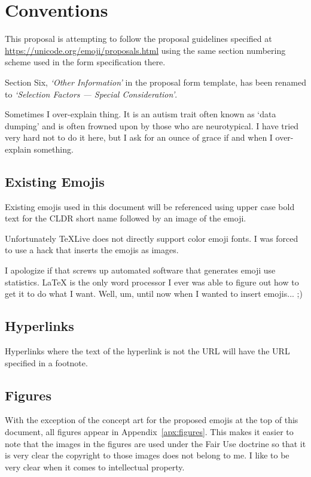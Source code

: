 \section*{Conventions}

This proposal is attempting to follow the proposal guidelines specified at
\url{https://unicode.org/emoji/proposals.html} using the same section numbering
scheme used in the form specification there.

Section Six, \textit{`Other Information'} in the proposal form template, has been renamed to
\textit{`Selection Factors --- Special Consideration'}.

Sometimes I over-explain thing. It is an autism trait often known as `data dumping' and
is often frowned upon by those who are neurotypical. I have tried very hard not to do
it here, but I ask for an ounce of grace if and when I over-explain something.

\subsection*{Existing Emojis}

Existing emojis used in this document will be referenced using upper case bold text for the CLDR short name
followed by an image of the emoji.

Unfortunately \TeX{}Live does not directly support color emoji fonts. I was forced to
use a hack that inserts the emojis as images.

I apologize if that screws up automated software that generates emoji use statistics.
\LaTeX{} is the only word processor I ever was able to figure out how to get it to do
what I want. Well, um,
until now when I wanted to insert emojis... ;)

\subsection*{Hyperlinks}

Hyperlinks where the text of the hyperlink is not the URL will have the URL specified
in a footnote.

\subsection*{Figures}

With the exception of the concept art for the proposed emojis at the top of
this document, all figures appear in Appendix~\ref{apx:figures}.
This makes it easier to note that the images in the figures are used under the Fair
Use doctrine so that it is very clear the copyright to those images does not belong
to me. I like to be very clear
when it comes to intellectual property.

